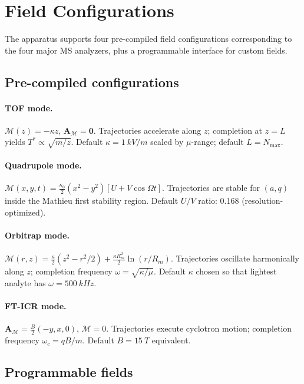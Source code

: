 \documentclass[twocolumn,11pt,a4paper]{article}
\theoremstyle{definition}
\theoremstyle{remark}
\newcommand{\Depth}{\mathcal{M}}
\newcommand{\Apartition}{\mathbf{A}_{\mathcal{M}}}
\newcommand{\partinert}{\mu}
\begin{document}
\section{Field Configurations}
\label{sec:fields}

The apparatus supports four pre-compiled field configurations corresponding to the four major MS analyzers, plus a programmable interface for custom fields.

\subsection{Pre-compiled configurations}

\paragraph{TOF mode.} $\Depth(z) = -\kappa z$, $\Apartition = \mathbf{0}$. Trajectories accelerate along $z$; completion at $z = L$ yields $T^\ast \propto \sqrt{m/z}$. Default $\kappa = \SI{1}{kV/m}$ scaled by $\partinert$-range; default $L = N_{\max}$.

\paragraph{Quadrupole mode.} $\Depth(x,y,t) = \tfrac{\kappa_0}{2}(x^2-y^2)[U + V\cos\Omega t]$. Trajectories are stable for $(a,q)$ inside the Mathieu first stability region. Default $U/V$ ratio: \num{0.168} (resolution-optimized).

\paragraph{Orbitrap mode.} $\Depth(r,z) = \tfrac{\kappa}{2}(z^2 - r^2/2) + \tfrac{\kappa R_m^2}{2}\ln(r/R_m)$. Trajectories oscillate harmonically along $z$; completion frequency $\omega = \sqrt{\kappa/\partinert}$. Default $\kappa$ chosen so that lightest analyte has $\omega = \SI{500}{kHz}$.

\paragraph{FT-ICR mode.} $\Apartition = \tfrac{B}{2}(-y, x, 0)$, $\Depth = 0$. Trajectories execute cyclotron motion; completion frequency $\omega_c = qB/m$. Default $B = \SI{15}{T}$ equivalent.

\subsection{Programmable fields}
\end{document}
